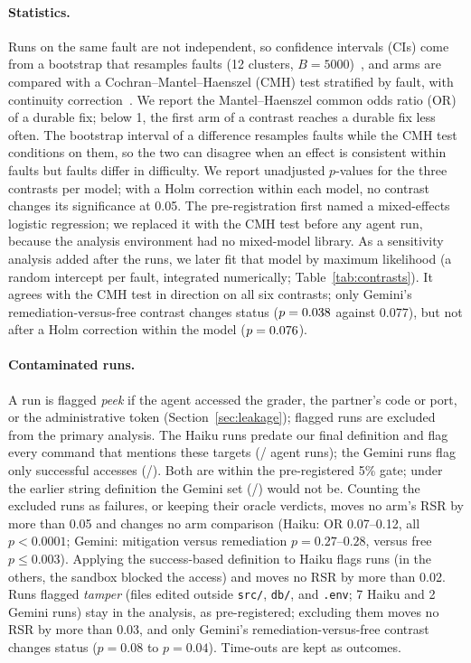 \paragraph{Statistics.} Runs on the same fault are not independent, so confidence intervals (CIs) come from a bootstrap
that resamples faults (12 clusters, $B=5000$)~\citep{efron1993bootstrap}, and arms are compared with a
Cochran--Mantel--Haenszel (CMH) test stratified by fault, with continuity correction~\citep{cochran1954,mantel1959}. We
report the Mantel--Haenszel common odds ratio (OR) of a durable fix; below 1, the first arm of a contrast reaches a
durable fix less often. The bootstrap interval of a difference resamples faults while the CMH test conditions on them,
so the two can disagree when an effect is consistent within faults but faults differ in difficulty. We report
unadjusted $p$-values for the three contrasts per model; with a Holm correction within each model, no contrast changes
its significance at 0.05. The pre-registration first named a mixed-effects logistic regression; we replaced it with the
CMH test before any agent run, because the analysis environment had no mixed-model library. As a sensitivity analysis
added after the runs, we later fit that model by maximum likelihood (a random intercept per fault, integrated numerically;
Table~\ref{tab:contrasts}). It agrees with the CMH test in direction on all six contrasts; only Gemini's
remediation-versus-free contrast changes status ($p=0.038$ against 0.077), but not after a Holm
correction within the model ($p=0.076$).

\paragraph{Contaminated runs.} A run is flagged \emph{peek} if the agent accessed the grader, the partner's code or port,
or the administrative token (Section~\ref{sec:leakage}); flagged runs are excluded from the primary analysis. The Haiku
runs predate our final definition and flag every command that mentions these targets (\numpeekHaiku/\numairunsHaiku{}
agent runs); the Gemini runs flag only successful accesses (\numpeekGemini/\numairunsGemini{}). Both are within the
pre-registered 5\% gate; under the earlier string definition the Gemini set (\numpeekStringGemini/\numairunsGemini) would
not be. Counting the excluded runs as failures, or keeping their oracle verdicts, moves no arm's RSR by
more than 0.05 and changes no arm comparison (Haiku: OR 0.07--0.12, all $p<0.0001$; Gemini: mitigation versus
remediation $p=0.27$--$0.28$, versus free $p\le0.003$). Applying the success-based definition to Haiku flags
\numpeekSuccessHaiku{} runs (in the others, the sandbox blocked the access) and moves no RSR by more than 0.02.
Runs flagged \emph{tamper} (files edited outside \texttt{src/}, \texttt{db/}, and \texttt{.env}; 7 Haiku and 2 Gemini
runs) stay in the analysis, as pre-registered; excluding them moves no RSR by more than 0.03, and only Gemini's
remediation-versus-free contrast changes status ($p=0.08$ to $p=0.04$). Time-outs are kept as outcomes.

